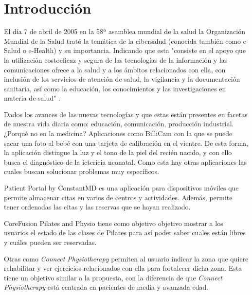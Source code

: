 \section{Introducción}
El día 7 de abril de 2005 en la 58ª asamblea mundial de la salud la Organización Mundial
de la Salud \cite{OMS} trató la temática de la cibersalud (conocida también como e-Salud
o e-Health) y su importancia. Indicando que esta "consiste en el apoyo que
la utilización costoeficaz y segura de las tecnologías de la información y las comunicaciones
ofrece a la salud y a los ámbitos relacionados con ella, con inclusión de los servicios de
atención de salud, la vigilancia y la documentación sanitaria, así como la educación, los
conocimientos y las investigaciones en materia de salud" \cite{58-asamblea}.

Dados los avances de las nuevas tecnologías y que estas están presentes en facetas de
nuestra vida diaria como: educación, comunicación, producción industrial. ¿Porqué no
en la medicina? Aplicaciones como
BilliCam \cite{BilliCam} con la que se puede sacar una foto al bebé con una tarjeta de
calibración en el vientre. De esta forma, la aplicación distingue la luz y el tono de la piel del recién
nacido, y con ello busca el diagnóstico de la ictericia neonatal. Como esta hay otras
aplicaciones las cuales buscan solucionar problemas muy específicos.

\medskip
Patient Portal by ConstantMD \cite{patient-portal} es una aplicación para dispositivos
móviles que permite  almacenar citas
en varios de centros y actividades. Además, permite tener ordenadas las citas y las
reservas que se hayan realizado.

\medskip
CoreFusion Pilates and Physio \cite{coreFusion} tiene como objetivo objetivo mostrar a
los usuarios el estado de las clases de Pilates para así poder saber cuales están
libres y cuáles pueden ser reservadas.

\medskip
Otras como \textit{Connect Physiotherapy} \cite{Connect-Physiotherapy} permiten al usuario
indicar la zona que quiere rehabilitar y ver ejercicios relacionados con ella para fortalecer
dicha zona. Esta tiene un objetivo similar a la propuesta, con la diferencia de que
\textit{Connect Physiotherapy} está centrada en pacientes de media y avanzada edad.

